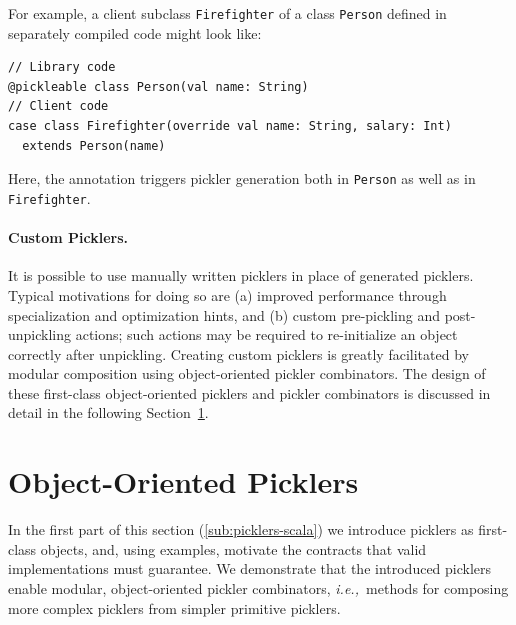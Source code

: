\documentclass[preprint,10pt]{sigplanconf}
\theoremstyle{definition}
\theoremstyle{definition}
\newcommand{\ie}{{\em i.e.,~}}
\newcommand{\ba}{\begin{array}}
\newcommand{\ea}{\end{array}}
\begin{document}
For example, a client subclass \verb|Firefighter| of a class \verb|Person|
defined in separately compiled code might look like:

\begin{lstlisting}
// Library code
@pickleable class Person(val name: String)
// Client code
case class Firefighter(override val name: String, salary: Int)
  extends Person(name)
\end{lstlisting}

Here, the annotation triggers pickler generation both in \verb|Person| as well as in \verb|Firefighter|.

\paragraph{Custom Picklers.} It is possible to use manually written picklers
in place of generated picklers. Typical motivations for doing so are (a)
improved performance through specialization and optimization hints, and (b) custom pre-pickling and post-unpickling
actions; such actions may be required to re-initialize an object
correctly after unpickling. Creating custom picklers is greatly facilitated by
modular composition using object-oriented pickler combinators. The design of
these first-class object-oriented picklers and pickler combinators is
discussed in detail in the following Section~\ref{sec:oopicklers}.


\section{Object-Oriented Picklers}\label{sec:oopicklers}

In the first part of this section (\ref{sub:picklers-scala}) we introduce
picklers as first-class objects, and, using examples, motivate the contracts
that valid implementations must guarantee. We demonstrate that the introduced
picklers enable modular, object-oriented pickler combinators, \ie methods for
composing more complex picklers from simpler primitive picklers.
\end{document}

